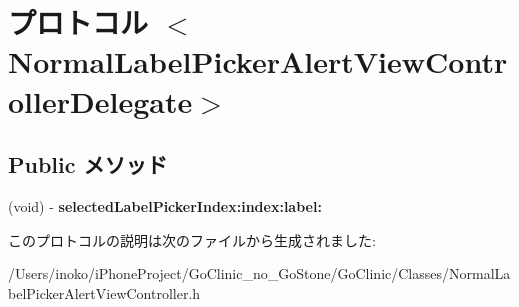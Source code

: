 \hypertarget{protocol_normal_label_picker_alert_view_controller_delegate-p}{
\section{プロトコル $<$NormalLabelPickerAlertViewControllerDelegate$>$}
\label{protocol_normal_label_picker_alert_view_controller_delegate-p}
}
\subsection*{Public メソッド}
\begin{DoxyCompactItemize}
\item 
\hypertarget{protocol_normal_label_picker_alert_view_controller_delegate-p_a89e0deae9375c0a2340d3b87dc6f8ea6}{
(void) -\/ {\bfseries selectedLabelPickerIndex:index:label:}}
\label{protocol_normal_label_picker_alert_view_controller_delegate-p_a89e0deae9375c0a2340d3b87dc6f8ea6}

\end{DoxyCompactItemize}


このプロトコルの説明は次のファイルから生成されました:\begin{DoxyCompactItemize}
\item 
/Users/inoko/iPhoneProject/GoClinic\_\-no\_\-GoStone/GoClinic/Classes/NormalLabelPickerAlertViewController.h\end{DoxyCompactItemize}
